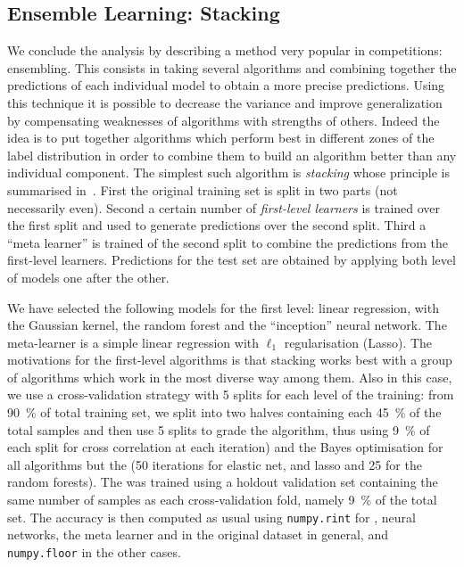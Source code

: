 \subsection{Ensemble Learning: Stacking}

We conclude the \ml analysis by describing a method very popular in \ml competitions: ensembling.
This consists in taking several \ml algorithms and combining together the predictions of each individual model to obtain a more precise predictions.
Using this technique it is possible to decrease the variance and improve generalization by compensating weaknesses of algorithms with strengths of others.
Indeed the idea is to put together algorithms which perform best in different zones of the label distribution in order to combine them to build an algorithm better than any individual component.
The simplest such algorithm is \emph{stacking} whose principle is summarised in~.
First the original training set is split in two parts (not necessarily even).
Second a certain number of \emph{first-level learners} is trained over the first split and used to generate predictions over the second split.
Third a ``meta learner'' is trained of the second split to combine the predictions from the first-level learners.
Predictions for the test set are obtained by applying both level of models one after the other.

We have selected the following models for the first level: linear regression, \svm with the Gaussian kernel, the random forest and the ``inception'' neural network.
The meta-learner is a simple linear regression with $\ell_1$ regularisation (Lasso).
The motivations for the first-level algorithms is that stacking works best with a group of algorithms which work in the most diverse way among them.
Also in this case, we use a cross-validation strategy with 5 splits for each level of the training: from \SI{90}{\percent} of total training set, we split into two halves containing each \SI{45}{\percent} of the total samples and then use 5 splits to grade the algorithm, thus using \SI{9}{\percent} of each split for cross correlation at each iteration) and the Bayes optimisation for all algorithms but the \ann (50 iterations for elastic net, \svm and lasso and 25 for the random forests).
The \ann was trained using a holdout validation set containing the same number of samples as each cross-validation fold, namely \SI{9}{\percent} of the total set.
The accuracy is then computed as usual using \texttt{numpy.rint} for \svm, neural networks, the meta learner and  in the original dataset in general, and \texttt{numpy.floor} in the other cases.

